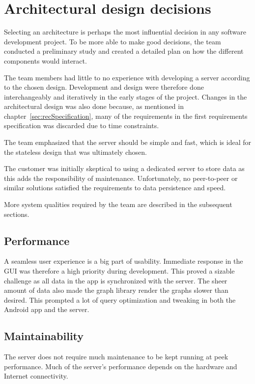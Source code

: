 \section{Architectural design decisions}
\label{sec:arch_design}
Selecting an architecture is perhaps the most influential decision in any software development project. To be more able to make good decisions, the team conducted a preliminary study and created a detailed plan on how the different components would interact. 

The team members had little to no experience with developing a server according to the chosen design. Development and design were therefore done interchangeably and iteratively in the early stages of the project. Changes in the architectural design was also done because, as mentioned in chapter~\ref{sec:recSpecification}, many of the requirements in the first requirements specification was discarded due to time constraints.

The team emphasized that the server should be simple and fast, which is ideal for the stateless design that was ultimately chosen. 

The customer was initially skeptical to using a dedicated server to store data as this adds the responsibility of maintenance. Unfortunately, no peer-to-peer or similar solutions satisfied the requirements to data persistence and speed.

More system qualities required by the team are described in the subsequent sections.

\subsection{Performance}
A seamless user experience is a big part of usability. Immediate response in the GUI was therefore a high priority during development. This proved a sizable challenge as all data in the app is synchronized with the server. 
The sheer amount of data also made the graph library render the graphs slower than desired. This prompted a lot of query optimization and tweaking in both the Android app and the server. 

\subsection{Maintainability}
The server does not require much maintenance to be kept running at peek performance. Much of the server's performance depends on the hardware and Internet connectivity. 

